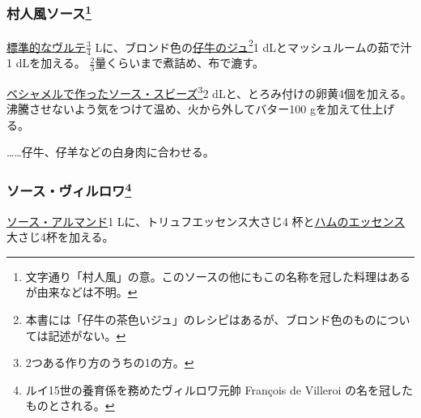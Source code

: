 \begin{recette}
{\subsubsection[村人風ソース]{\texorpdfstring{村人風ソース\footnote{文字通り「村人風」の意。このソースの他にもこの名称を冠した料理はあるが由来などは不明。}}{村人風ソース}}\label{sauce-villageoise}}



\protect\hyperlink{veloute}{標準的なヴルテ}\(\frac{3}{4}\)
Lに、ブロンド色の\protect\hyperlink{jus-de-veau-brun}{仔牛のジュ}\footnote{本書には「仔牛の茶色いジュ」のレシピはあるが、ブロンド色のものについては記述がない。}1
dLとマッシュルームの茹で汁1 dLを加える。
\(\frac{2}{3}\)量くらいまで煮詰め、布で漉す。

\protect\hyperlink{sauce-soubise}{ベシャメルで作ったソース・スビーズ}\footnote{2つある作り方のうちの1の方。}2
dLと、とろみ付けの卵黄4個を加える。沸騰させないよう気をつけて温め、火から外してバター100
gを加えて仕上げる。

\ldots{}\ldots{}仔牛、仔羊などの白身肉に合わせる。

\hypertarget{sauce-villeroy}{%
\subsubsection[ソース・ヴィルロワ]{\texorpdfstring{ソース・ヴィルロワ\footnote{ルイ15世の養育係を務めたヴィルロワ元帥
  François de Villeroi の名を冠したものとされる。}}{ソース・ヴィルロワ}}\label{sauce-villeroy}}



\protect\hyperlink{sauce-allemande}{ソース・アルマンド}1
Lに、トリュフエッセンス大さじ4
杯と\protect\hyperlink{essences-diverses}{ハムのエッセンス}大さじ4杯を加える。


\end{recette}
